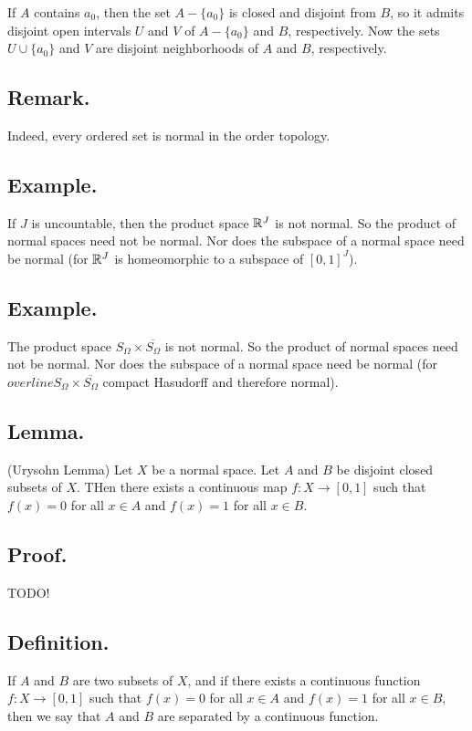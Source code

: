 \documentclass[titlepage]{article}
\begin{document}
If $A$ contains $a_{0}$, then the set $A - \{a_{0}\}$ is closed and disjoint from $B$, so it admits disjoint open intervals $U$ and $V$ of $A - \{a_{0}\}$ and $B$, respectively. Now the sets $U \cup \{a_{0}\}$ and $V$ are disjoint neighborhoods of $A$ and $B$, respectively.

\subsection{Remark.} Indeed, every ordered set is normal in the order topology.

\subsection{Example.} If $J$ is uncountable, then the product space $\mathbb{R}^{J}$ is not normal. So the product of normal spaces need not be normal. Nor does the subspace of a normal space need be normal (for $\mathbb{R}^{J}$ is homeomorphic to a subspace of $[0, 1]^{J}$).

\subsection{Example.} The product space $S_{\Omega} \times \overline{S_{\Omega}}$ is not normal. So the product of normal spaces need not be normal. Nor does the subspace of a normal space need be normal (for $overline{S_{\Omega}} \times \overline{S_{\Omega}}$ compact Hasudorff and therefore normal).

\subsection{Lemma.} (Urysohn Lemma) Let $X$ be a normal space. Let $A$ and $B$ be disjoint closed subsets of $X$. THen there exists a continuous map $f: X \to [0, 1]$ such that $f(x) = 0$ for all $x \in A$ and $f(x) = 1$ for all $x \in B$.

\subsection{Proof.} TODO!

\subsection{Definition.} If $A$ and $B$ are two subsets of $X$, and if there exists a continuous function $f: X \to [0, 1]$ such that $f(x) = 0$ for all $x \in A$ and $f(x) = 1$ for all $x \in B$, then we say that $A$ and $B$ are separated by a continuous function.
\end{document}
